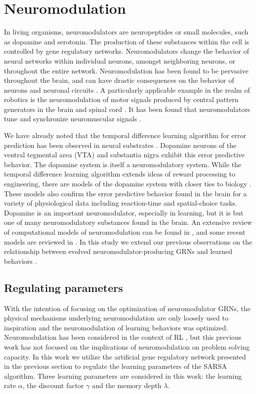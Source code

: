 \section{Neuromodulation}
In living organisms, neuromodulators are neuropeptides or small molecules, such as dopamine and
serotonin. The production of these substances within the cell is controlled by
gene regulatory networks. Neuromodulators change the behavior of neural networks
within individual neurons, amongst neighboring neurons, or throughout the entire
network. Neuromodulation has been found to be pervasive throughout the brain,
and can have drastic consequences on the behavior of neurons and neuronal
circuits \cite{Destexhe2004,Marder2012,Marder2002}. A particularly applicable
example in the realm of robotics is the neuromodulation of motor signals
produced by central pattern generators in the brain and spinal cord
\cite{Katz1995}. It has been found that neuromodulators tune and synchronize
neuromuscular signals \cite{Zhurov2006}.

We have already noted that the temporal difference learning algorithm for error
prediction has been observed in neural substrates \cite{Schultz1993}.
Dopamine neurons of the ventral tegmental area (VTA) and substantia nigra
exhibit this error predictive behavior. The dopamine system is itself a 
neuromodulatory system. While the temporal difference learning algorithm
extends ideas of reward processing to engineering, there are models of
the dopamine system with closer ties to biology \cite{Montague1996}. These
models also confirm the error predictive behavior found in the brain for a
variety of physiological data including reaction-time and spatial-choice
tasks. Dopamine is an important neuromodulator, especially in learning, but
it is but one of many neuromodulatory substances found in the brain. An
extensive review of computational models of neuromodulation can be found in
\cite{Fellous1998}, and some recent models are reviewed in \cite{Marder2012}.
In this study we extend our previous observations on the relationship between evolved neuromodulator-producing
GRNs and learned behaviors \cite{Harrington2013}. 

\subsection{Regulating parameters}
With the intention of focusing on the optimization of neuromodulator GRNs, the physical mechanisms underlying neuromodulation are only loosely used to inspiration and the neuromodulation of learning behaviors was optimized. Neuromodulation has been considered in the context of RL \cite{Doya2002,Schweighofer2003,Doya2008}, but this previous work has not focused on the implications of neuromodulation on problem solving capacity. In this work we utilize the artificial gene regulatory network presented in the previous section to regulate the learning parameters of the SARSA algorithm. Three learning parameters are considered in this work: the learning rate $\alpha$, the discount factor $\gamma$ and the memory depth $\lambda$.

